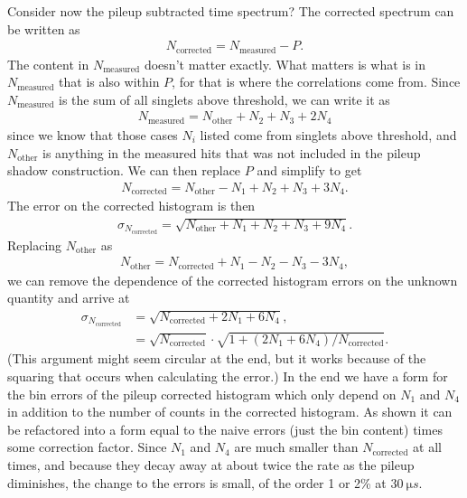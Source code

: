 Consider now the pileup subtracted time spectrum? The corrected spectrum can be written as
 	\begin{align}
 		N_{\text{corrected}} = N_{\text{measured}} - P.
	\end{align}
The content in $N_{\text{measured}}$ doesn't matter exactly. What matters is what is in $N_{\text{measured}}$ that is also within $P$, for that is where the correlations come from. Since $N_{\text{measured}}$ is the sum of all singlets above threshold, we can write it as
 	\begin{align}
 		N_{\text{measured}} = N_{\text{other}} + N_{2} + N_{3} + 2 N_{4}
	\end{align}
since we know that those cases $N_{i}$ listed come from singlets above threshold, and $N_{\text{other}}$ is anything in the measured hits that was not included in the pileup shadow construction. We can then replace $P$ and simplify to get
 	\begin{align}
 		N_{\text{corrected}} = N_{\text{other}} - N_{1} + N_{2} + N_{3} + 3 N_{4}.
	\end{align}
The error on the corrected histogram is then 
 	\begin{align}
 		\sigma_{N_{\text{corrected}}} = \sqrt{N_{\text{other}} + N_{1} + N_{2} + N_{3} + 9 N_{4}}.
	\end{align}
Replacing $N_{\text{other}}$ as
 	\begin{align}
 		N_{\text{other}} = N_{\text{corrected}} + N_{1} - N_{2} - N_{3} - 3 N_{4},
	\end{align}
we can remove the dependence of the corrected histogram errors on the unknown quantity and arrive at
	\begin{equation}	
	\begin{aligned}
 		\sigma_{N_{\text{corrected}}} &= \sqrt{N_{\text{corrected}} + 2 N_{1} + 6 N_{4}}, \\
 									  &= \sqrt{N_{\text{corrected}}} \cdot \sqrt{1 + (2 N_{1} + 6 N_{4})/N_{\text{corrected}}}.
 	\label{eq:pileupModErrors}
	\end{aligned}
	\end{equation}
(This argument might seem circular at the end, but it works because of the squaring that occurs when calculating the error.) In the end we have a form for the bin errors of the pileup corrected histogram which only depend on $N_{1}$ and $N_{4}$ in addition to the number of counts in the corrected histogram. As shown it can be refactored into a form equal to the naive errors (just the bin content) times some correction factor. Since $N_{1}$ and $N_{4}$ are much smaller than $N_{\text{corrected}}$ at all times, and because they decay away at about twice the rate as the pileup diminishes, the change to the errors is small, of the order 1 or 2\% at $\SI{30}{\micro s}$.




